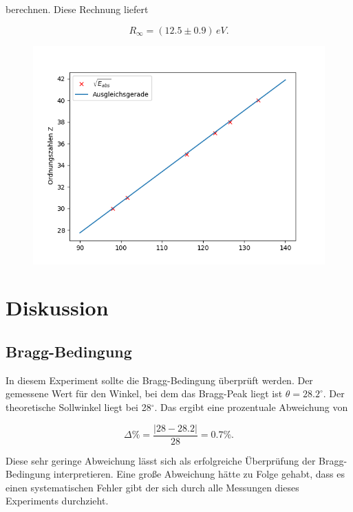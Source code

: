 berechnen. Diese Rechnung liefert 

\begin{equation*}
    R_\infty = (12.5\pm 0.9)\, eV.
\end{equation*}

\begin{figure}
    \centering
    \includegraphics{ryd.png}
    \label{fig:ryd}
\end{figure}

\section{Diskussion}

\subsection{Bragg-Bedingung}

In diesem Experiment sollte die Bragg-Bedingung überprüft werden. Der gemessene Wert für den Winkel, bei dem das Bragg-Peak liegt ist $\theta = 28.2^\circ$. Der theoretische Sollwinkel liegt bei 28$^\circ$. Das ergibt eine prozentuale Abweichung von

\begin{equation*}
    \Delta \% = \frac{|28-28.2|}{28} = 0.7 \%.
\end{equation*}

Diese sehr geringe Abweichung lässt sich als erfolgreiche Überprüfung der Bragg-Bedingung interpretieren. Eine große Abweichung hätte zu Folge gehabt, dass es einen systematischen Fehler gibt der sich durch alle Messungen dieses Experiments durchzieht. 

